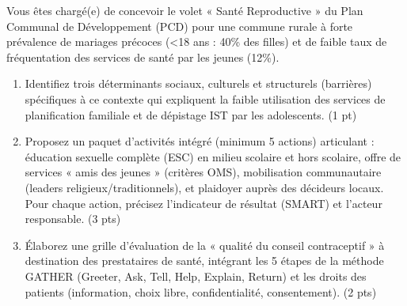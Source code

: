 \documentclass[11pt]{article}
\begin{document}
\begin{exercice}
Vous êtes chargé(e) de concevoir le volet « Santé Reproductive » du Plan Communal de Développement (PCD) pour une commune rurale à forte prévalence de mariages précoces (\textless 18 ans : 40\% des filles) et de faible taux de fréquentation des services de santé par les jeunes (12\%).

\begin{enumerate}
    \item Identifiez trois déterminants sociaux, culturels et structurels (barrières) spécifiques à ce contexte qui expliquent la faible utilisation des services de planification familiale et de dépistage IST par les adolescents. (1 pt)
    \item Proposez un paquet d'activités intégré (minimum 5 actions) articulant : éducation sexuelle complète (ESC) en milieu scolaire et hors scolaire, offre de services « amis des jeunes » (critères OMS), mobilisation communautaire (leaders religieux/traditionnels), et plaidoyer auprès des décideurs locaux. Pour chaque action, précisez l'indicateur de résultat (SMART) et l'acteur responsable. (3 pts)
    \item Élaborez une grille d'évaluation de la « qualité du conseil contraceptif » à destination des prestataires de santé, intégrant les 5 étapes de la méthode GATHER (Greeter, Ask, Tell, Help, Explain, Return) et les droits des patients (information, choix libre, confidentialité, consentement). (2 pts)
\end{enumerate}
\end{exercice}
\end{document}
